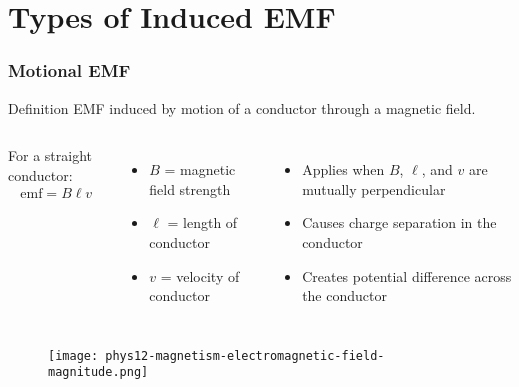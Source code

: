 \documentclass{beamer}
\begin{document}
\section{Types of Induced EMF}

\begin{frame}
\frametitle{Motional EMF}
\begin{block}{Definition}
EMF induced by motion of a conductor through a magnetic field.
\end{block}

\begin{columns}
For a straight conductor:
\begin{align}
\text{emf} = B\ell v
\end{align}

\begin{itemize}
\item $B$ = magnetic field strength
\item $\ell$ = length of conductor
\item $v$ = velocity of conductor
\end{itemize}

\begin{itemize}
\item Applies when $B$, $\ell$, and $v$ are mutually perpendicular
\item Causes charge separation in the conductor
\item Creates potential difference across the conductor
\end{itemize}
\end{columns}
\end{frame}

\begin{frame}
\begin{figure}
    \centering
    \texttt{[image: phys12-magnetism-electromagnetic-field-magnitude.png]}
\end{figure}
\end{frame}
\end{document}

